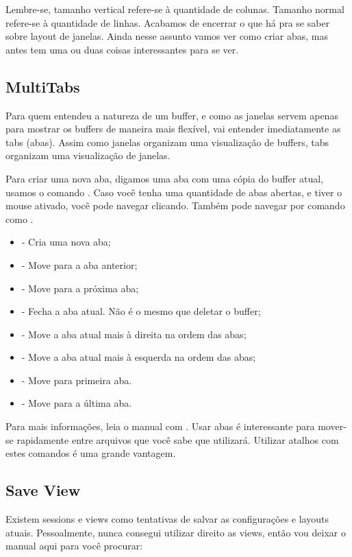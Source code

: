 \documentclass[a4paper, 12pt]{article}
\begin{document}
Lembre-se, tamanho vertical refere-se à quantidade de colunas. Tamanho normal refere-se à quantidade de linhas.
Acabamos de encerrar o que há pra se saber sobre layout de janelas.
Ainda nesse assunto vamos ver como criar abas, mas antes tem uma ou duas coisas interessantes para se ver.


\subsection{MultiTabs}
Para quem entendeu a natureza de um buffer, e como as janelas servem apenas para mostrar os buffers
de maneira mais flexível, vai entender imediatamente as tabs (abas).
Assim como janelas organizam uma visualização de buffers, tabs organizam uma visualização de janelas.

Para criar uma nova aba, digamos uma aba com uma cópia do buffer atual, usamos o comando .
Caso você tenha uma quantidade de abas abertas, e tiver o mouse ativado, você pode navegar clicando.
Também pode navegar por comando como .

\begin{itemize}
    \item {} - Cria uma nova aba;
    \item {} - Move para a aba anterior;
    \item {} - Move para a próxima aba;
    \item {} - Fecha a aba atual. Não é o mesmo que deletar o buffer;
    \item {} - Move a aba atual mais à direita na ordem das abas;
    \item {} - Move a aba atual mais à esquerda na ordem das abas;
    \item {} - Move para primeira aba.
    \item {} - Move para a última aba.
\end{itemize}

Para mais informações, leia o manual com .
Usar abas é interessante para mover-se rapidamente entre arquivos que você sabe que utilizará.
Utilizar atalhos com estes comandos é uma grande vantagem.

\subsection{Save View}
Existem sessions e views como tentativas de salvar as configurações e layouts atuais.
Pessoalmente, nunca consegui utilizar direito as views, então vou deixar o manual aqui para você procurar:
\end{document}
